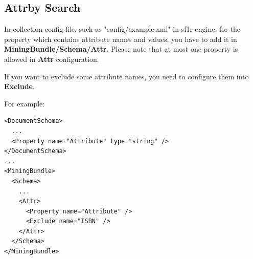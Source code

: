\subsection{Attrby Search}
In collection config file, such as "config/example.xml" in sf1r-engine, for the property which contains attribute names and values,
you have to add it in \textbf{MiningBundle/Schema/Attr}. Please note that at most one property is allowed in \textbf{Attr} configuration.

If you want to exclude some attribute names, you need to configure them into \textbf{Exclude}.

For example:

\begin{lstlisting}
<DocumentSchema>
  ...
  <Property name="Attribute" type="string" />
</DocumentSchema>
...
<MiningBundle>
  <Schema>
    ...
    <Attr>
      <Property name="Attribute" />
      <Exclude name="ISBN" />
    </Attr>
  </Schema>
</MiningBundle>
\end{lstlisting}


